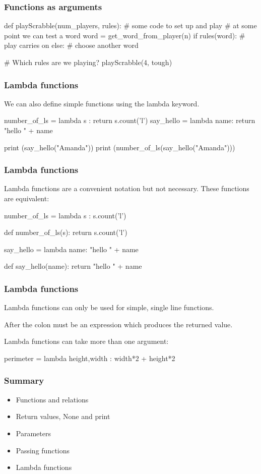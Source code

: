 \documentclass{beamer}
\begin{document}
\begin{frame}[fragile]
\frametitle{Functions as arguments}
\begin{code}
def playScrabble(num_players, rules):
   # some code to set up and play
   # at some point we can test a word
   word = get_word_from_player(n)
   if rules(word):
      # play carries on
   else:
      # choose another word

# Which rules are we playing?
playScrabble(4, tough)
\end{code}
\end{frame}


\begin{frame}[fragile]
\frametitle{Lambda functions}
We can also define simple functions using the lambda keyword. 
\begin{code}
number_of_ls = lambda s : return s.count('l')
say_hello = lambda name: return "hello " + name 

print (say_hello("Amanda"))
print (number_of_ls(say_hello("Amanda")))
\end{code}
\end{frame}

\begin{frame}[fragile]
\frametitle{Lambda functions}
Lambda functions are a convenient notation but not necessary. 
These functions are equivalent:
\begin{code}
number_of_ls = lambda s : s.count('l')

def number_of_ls(s):
   return s.count('l')
\end{code}
\begin{code}
say_hello = lambda name: "hello " + name 

def say_hello(name):
   return "hello " + name 
\end{code}
\end{frame}

\begin{frame}[fragile]
\frametitle{Lambda functions}
Lambda functions can only be used for simple, single line functions.

\bigskip

After the colon must be an expression which produces the returned
value.

\bigskip

Lambda functions can take more than one argument:

\begin{code}
perimeter = lambda height,width : width*2 + height*2 
\end{code}
\end{frame}

\begin{frame}
\frametitle{Summary}
\begin{itemize}
\item Functions and relations
\item Return values, None and print
\item Parameters
\item Passing functions
\item Lambda functions
\end{itemize}
\end{frame}
\end{document}
